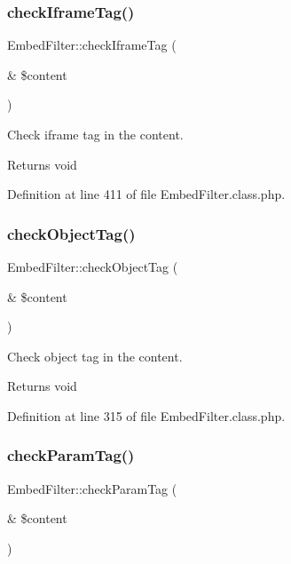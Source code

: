 \mbox{\label{classEmbedFilter_a1026957e48eed307ee66c506f54a1847}} 
\subsubsection{\texorpdfstring{check\+Iframe\+Tag()}{checkIframeTag()}}
{\footnotesize\ttfamily Embed\+Filter\+::check\+Iframe\+Tag (\begin{DoxyParamCaption}\item[{\&}]{\$content }\end{DoxyParamCaption})}

Check iframe tag in the content. \begin{DoxyReturn}{Returns}
void 
\end{DoxyReturn}


Definition at line 411 of file Embed\+Filter.\+class.\+php.

\mbox{\label{classEmbedFilter_a3c703c014813fb916c72d95e964a3e0d}} 
\subsubsection{\texorpdfstring{check\+Object\+Tag()}{checkObjectTag()}}
{\footnotesize\ttfamily Embed\+Filter\+::check\+Object\+Tag (\begin{DoxyParamCaption}\item[{\&}]{\$content }\end{DoxyParamCaption})}

Check object tag in the content. \begin{DoxyReturn}{Returns}
void 
\end{DoxyReturn}


Definition at line 315 of file Embed\+Filter.\+class.\+php.

\mbox{\label{classEmbedFilter_ac0bed1ed95e5b5afb465051ad77d4569}} 
\subsubsection{\texorpdfstring{check\+Param\+Tag()}{checkParamTag()}}
{\footnotesize\ttfamily Embed\+Filter\+::check\+Param\+Tag (\begin{DoxyParamCaption}\item[{\&}]{\$content }\end{DoxyParamCaption})}

